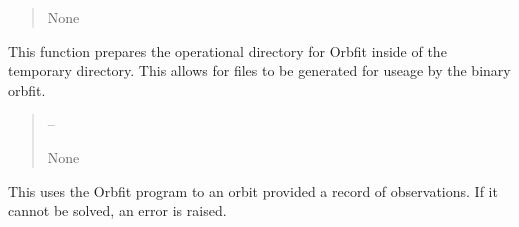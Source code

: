 \documentclass[letterpaper,11pt,english]{sphinxmanual}
\begin{document}
\begin{savenotes}
\begin{fulllineitems}
\begin{savenotes}
\begin{fulllineitems}
\begin{quote}
\begin{description}
\sphinxAtStartPar
None

\end{description}\end{quote}

\end{fulllineitems}\end{savenotes}


\begin{savenotes}\begin{fulllineitems}
\label{\detokenize{code/opihiexarata.orbit.orbfit:opihiexarata.orbit.orbfit.OrbfitOrbitDeterminerEngine._prepare_orbfit_files}}
\pysigstartsignatures
{}
\pysigstopsignatures
\sphinxAtStartPar
This function prepares the operational directory for Orbfit inside
of the temporary directory. This allows for files to be generated for
useage by the binary orbfit.
\begin{quote}\begin{description}
\sphinxAtStartPar
{} – 

\sphinxAtStartPar
None

\end{description}\end{quote}

\end{fulllineitems}\end{savenotes}


\begin{savenotes}\begin{fulllineitems}
\label{\detokenize{code/opihiexarata.orbit.orbfit:opihiexarata.orbit.orbfit.OrbfitOrbitDeterminerEngine._solve_single_orbit}}
\pysigstartsignatures
{}
\pysigstopsignatures
\sphinxAtStartPar
This uses the Orbfit program to an orbit provided a record of
observations. If it cannot be solved, an error is raised.


\end{fulllineitems}
\end{savenotes}
\end{fulllineitems}
\end{savenotes}
\end{document}
